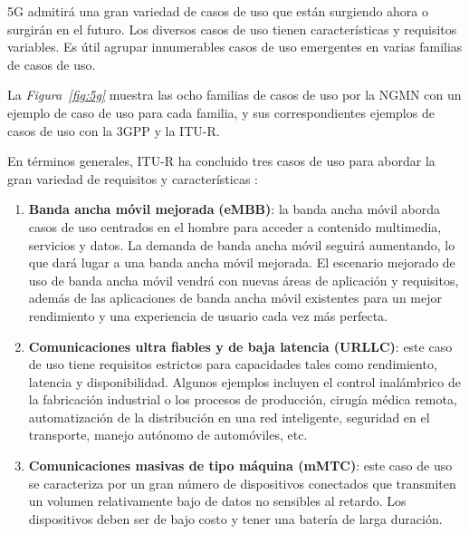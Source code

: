 5G admitirá una gran variedad de casos de uso que están surgiendo ahora o surgirán en el futuro. Los diversos casos de uso tienen características y requisitos variables. Es útil agrupar innumerables casos de uso emergentes en varias familias de casos de uso. \newline

La \textit{Figura~\ref{fig:5g}} muestra las ocho familias de casos de uso por la NGMN con un ejemplo de caso de uso para cada familia, y sus correspondientes ejemplos de casos de uso con la 3GPP y la ITU-R.\newline

En términos generales, ITU-R ha concluido tres casos de uso para abordar la gran variedad de requisitos y características \parencite{5gMobileComms}:

\begin{enumerate}
    \item \textbf{Banda ancha móvil mejorada} \textbf{(eMBB)}: la banda ancha móvil aborda casos de uso centrados en el hombre para acceder a contenido multimedia, servicios y datos. La demanda de banda ancha móvil seguirá aumentando, lo que dará lugar a una banda ancha móvil mejorada. El escenario mejorado de uso de banda ancha móvil vendrá con nuevas áreas de aplicación y requisitos, además de las aplicaciones de banda ancha móvil existentes para un mejor rendimiento y una experiencia de usuario cada vez más perfecta.
    \item \textbf{Comunicaciones ultra fiables y de baja latencia (URLLC)}: este caso de uso tiene requisitos estrictos para capacidades tales como rendimiento, latencia y disponibilidad. Algunos ejemplos incluyen el control inalámbrico de la fabricación industrial o los procesos de producción, cirugía médica remota, automatización de la distribución en una red inteligente, seguridad en el transporte, manejo autónomo de automóviles, etc.
    \item \textbf{Comunicaciones masivas de tipo máquina (mMTC)}: este caso de uso se caracteriza por un gran número de dispositivos conectados que transmiten un volumen relativamente bajo de datos no sensibles al retardo. Los dispositivos deben ser de bajo costo y tener una batería de larga duración.
\end{enumerate}


